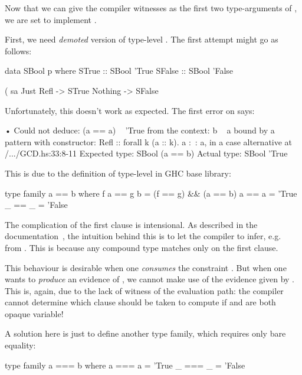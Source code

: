 \documentclass[demotion-paper.tex]{subfiles}
\begin{document}
Now that we can give the compiler witnesses as the first two type-arguments of , we are set to implement .

First, we need \emph{demoted} version of type-level \hask{(==)}.
The first attempt might go as follows:
\begin{code}
data SBool p where
  STrue  :: SBool 'True
  SFalse :: SBool 'False

(%
sa %
  Just Refl -> STrue
  Nothing -> SFalse
\end{code}
Unfortunately, this doesn't work as expected.
The first error on  says:

\begin{repl}
• Could not deduce: (a == a) ~ 'True
  from the context: b ~ a
    bound by a pattern with constructor:
               Refl :: forall k (a :: k). a :~: a,
             in a case alternative
    at /.../GCD.hs:33:8-11
  Expected type: SBool (a == b)
    Actual type: SBool 'True
\end{repl}

This is due to the definition of type-level \hask{(==)} in GHC base library:

\begin{code}
type family a == b where
  f a == g b = (f == g) && (a == b)
  a   == a   = 'True
  _   == _   = 'False
\end{code}

The complication of the first clause is intensional.
As described in the documentation~\cite{GHC-Team:2021aa}, the intuition behind this is to let the compiler to infer, e.g.\  from .
This is because any compound type matches only on the first clause.

This behaviour is desirable when one \emph{consumes} the constraint .
But when one wants to \emph{produce} an evidence of , we cannot make use of the evidence given by .
This is, again, due to the lack of witness of the evaluation path: the compiler cannot determine which clause should be taken to compute  if  and  are both opaque variable!

A solution here is just to define another type family, which requires only bare equality:
\begin{code}
type family a === b where
  a === a = 'True
  _ === _ = 'False
\end{code}
\end{document}
